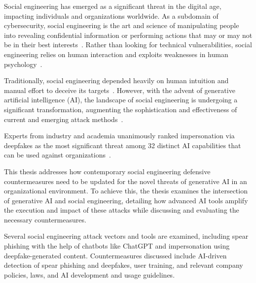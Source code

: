 %
%
Social engineering has emerged as a significant threat in the digital age, impacting individuals and organizations worldwide. As a subdomain of cybersecurity, social engineering is the art and science of manipulating people into revealing confidential information or performing actions that may or may not be in their best interests~\citep{hadnagy_Social_Engineering_The_Science_2018}. Rather than looking for technical vulnerabilities, social engineering relies on human interaction and exploits weaknesses in human psychology~\citep{wang_Defining_Social_Engineering_2020}.





%
%
Traditionally, social engineering depended heavily on human intuition and manual effort to deceive its targets~\citep{mitnick_The_Art_of_Deception_2003, mirsky_Threat_Offensive_AI_Organizations_2023}. However, with the advent of generative artificial intelligence (AI), the landscape of social engineering is undergoing a significant transformation, augmenting the sophistication and effectiveness of current and emerging attack methods~\citep{fakhouri_AI_Driven_Solutions_SE_Attacks_2024}.

Experts from industry and academia unanimously ranked impersonation via deepfakes as the most significant threat among 32 distinct AI capabilities that can be used against organizations~\citep{mirsky_Threat_Offensive_AI_Organizations_2023}.






%
%
This thesis addresses how contemporary social engineering defensive countermeasures need to be updated for the novel threats of generative AI in an organizational environment. To achieve this, the thesis examines the intersection of generative AI and social engineering, detailing how advanced AI tools amplify the execution and impact of these attacks while discussing and evaluating the necessary countermeasures.





%
%
Several social engineering attack vectors and tools are examined, including spear phishing with the help of chatbots like ChatGPT and impersonation using deepfake-generated content. Countermeasures discussed include AI-driven detection of spear phishing and deepfakes, user training, and relevant company policies, laws, and AI development and usage guidelines.





